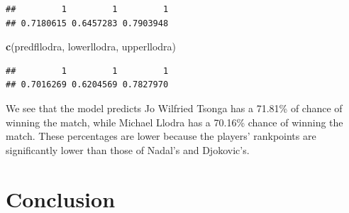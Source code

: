 \documentclass[]{article}
\newenvironment{Shaded}{\begin{snugshade}}{\end{snugshade}}
\newcommand{\KeywordTok}[1]{\textcolor[rgb]{0.13,0.29,0.53}{\textbf{#1}}}
\newcommand{\NormalTok}[1]{#1}
\begin{document}
\begin{verbatim}
##         1         1         1 
## 0.7180615 0.6457283 0.7903948
\end{verbatim}

\begin{Shaded}
\begin{Highlighting}[]
\KeywordTok{c}\NormalTok{(predfllodra, lowerllodra, upperllodra)}
\end{Highlighting}
\end{Shaded}

\begin{verbatim}
##         1         1         1 
## 0.7016269 0.6204569 0.7827970
\end{verbatim}

We see that the model predicts Jo Wilfried Tsonga has a 71.81\% of
chance of winning the match, while Michael Llodra has a 70.16\% chance
of winning the match. These percentages are lower because the players'
rankpoints are significantly lower than those of Nadal's and Djokovic's.

\hypertarget{conclusion}{%
\section{Conclusion}\label{conclusion}}
\end{document}
